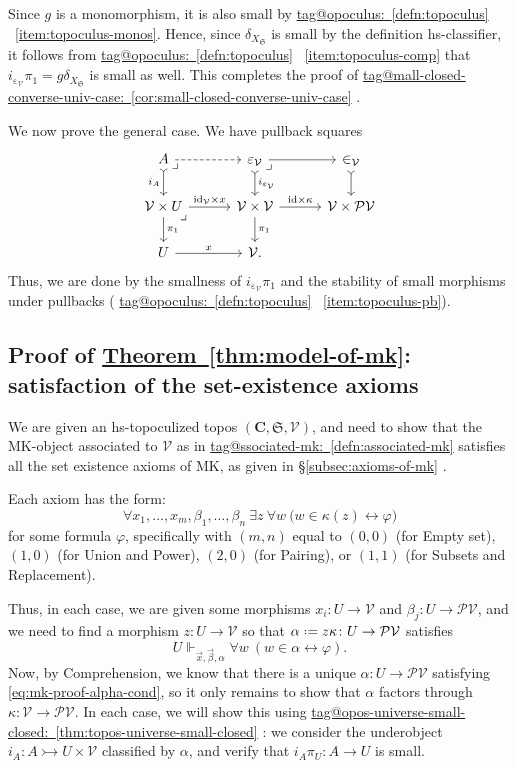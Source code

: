 \documentclass{amsart}
\makeatletter
\newcommand\alttext{\texorpdfstring}
\newcommand\bC{\mathbf{C}}
\newcommand\cV{\mathcal{V}}
\newcommand\defeq{\mathrel{\vcenter{\baselineskip0.5ex \lineskiplimit0pt \hbox{.}\hbox{.}}} =}
\newcommand\ein{\mathrel{\varepsilon}}
\newcommand\fS{\mathfrak{S}}
\newcommand\id{\mathrm{id}}
\newcommand\pb[1][rd]{\ar[#1, phantom, "\lrcorner", pos=0]}
\newcommand\pbig[1]{\big({#1}\big)}
\renewcommand\phi{\varphi}
\newcommand\pow{\mathcal{P}}
\newcommand\tot{\leftrightarrow}
\newcommand\tto{\rightarrowtail}
\newcommand\vek[1]{{\vec{#1}}}
\newcommand\vx{\vek{x}}
\newcommand\tagword[1]{\csname tag@#1\endcsname}
\def\label@tag#1:#2\@nil{#1}
\newcommand\labeltag[1]{\label@tag#1:\@nil}
\newcommand\jref[1]{%
  \texorpdfstring%
    {\hyperref[#1]{\tagword{\labeltag{#1}}~\ref*{#1}}}%
    {\tagword{\labeltag{#1}}~\ref*{#1}}%
}
\newcommand\prerefpost[3]{%
  \texorpdfstring%
    {\hyperref[#2]{#1\ref*{#2}#3}}%
    {#1\ref*{#2}#3}%
}
\newcommand\sref[1]{\prerefpost{\S}{#1}{}}
\theoremstyle{definition}
\theoremstyle{remark}
\theoremstyle{plainwithref}
\makeatother
\begin{document}
Since \( g \) is a monomorphism, it is also small by \jref{defn:topoculus}~\ref{item:topoculus-monos}.
Hence, since \( \delta_{X_\fS} \) is small by the definition hs-classifier, it follows from \jref{defn:topoculus}~\ref{item:topoculus-comp} that \( i_{\ein_\cV} \pi_1 = g \delta_{X_{\fS}} \) is small as well.
This completes the proof of \jref{cor:small-closed-converse-univ-case}.

We now prove the general case.
We have pullback squares
\[
  \begin{tikzcd}[column sep=30pt]
    A \ar[r, dashed] \ar[d, "i_A"', >->] \pb & \ein_{\cV} \pb \ar[d, "i_{\ein_{\cV}}", >->] \ar[r] & \in_\cV \ar[d, >->] \\
    \cV \times U \ar[r, "\id_{\cV} \times x"] \ar[d, "\pi_1"] \pb & \cV \times \cV \ar[d, "\pi_1"] \ar[r, "\id \times \kappa"] & \cV \times \pow \cV \\
    U \ar[r, "x"] & \cV.
  \end{tikzcd}
\]
Thus, we are done by the smallness of \( i_{\ein_{\cV}} \pi_1 \) and the stability of small morphisms under pullbacks (\jref{defn:topoculus}~\ref{item:topoculus-pb}).

\subsection{Proof of \alttext{\hyperref[thm:model-of-mk]{Theorem~\ref*{thm:model-of-mk}}}{Theorem~\ref*{thm:model-of-mk}}: satisfaction of the set-existence axioms} \label{subsec:proof-of-set-existence-axioms}
We are given an hs-topoculized topos \( (\bC, \fS, \cV) \), and need to show that the MK-object associated to \( \cV \) as in \jref{defn:associated-mk} satisfies all the set existence axioms of MK, as given in \sref{subsec:axioms-of-mk}.

Each axiom has the form:
\[
  \forall x_1,\ldots,x_m,\beta_1,\ldots,\beta_n\
  \exists z\ \forall w\ \pbig{w \in \kappa(z) \tot \phi}
\]
for some formula \( \phi \), specifically with \( (m,n) \) equal to \( (0,0) \) (for Empty set), \( (1, 0) \) (for Union and Power), \( (2, 0) \) (for Pairing), or \( (1, 1) \) (for Subsets and Replacement).

Thus, in each case, we are given some morphisms \( x_i \colon U \to \cV \) and \( \beta_j \colon U \to \pow \cV \), and we need to find a morphism \( z \colon U \to \cV \) so that \( \alpha \defeq z \kappa \colon U \to \pow \cV \) satisfies
\begin{equation} \label{eq:mk-proof-alpha-cond}
  U \Vdash_{\vx, \vek \beta, \alpha} \forall w\ (w \in \alpha \tot \phi).
\end{equation}
Now, by Comprehension, we know that there is a unique \( \alpha \colon U \to \pow \cV \) satisfying \eqref{eq:mk-proof-alpha-cond}, so it only remains to show that \( \alpha \) factors through \( \kappa \colon \cV \to \pow \cV \).
In each case, we will show this using \jref{thm:topos-universe-small-closed}: we consider the underobject \( i_A \colon A \tto U \times \cV \) classified by \( \alpha \), and verify that \( i_A \pi_U \colon A \to U \) is small.
\end{document}
